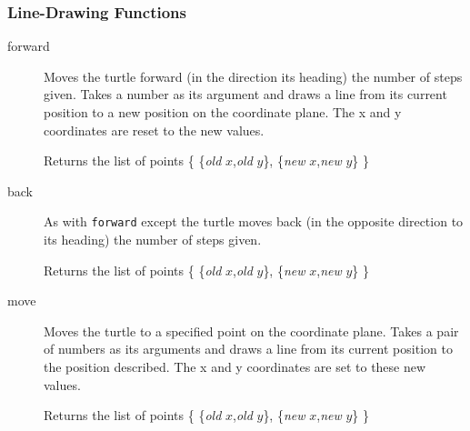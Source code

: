 \subsubsection{Line-Drawing Functions}
\begin{description}
 \item[forward] Moves the turtle forward (in the direction its heading)
       the number of steps given. Takes a number as its argument and draws
       a line from its current position to a new position on the
       coordinate plane. The x and y coordinates are reset to the new
       values.

       Returns the list of points  
    \{ \{\textit{old} $x$,\textit{old} $y$\}, \{\textit{new} $x$,\textit{new} $y$\} \}

 
 \item[back] As with \texttt{forward} except the turtle moves back (in the
       opposite direction to its heading) the number of steps given.

       Returns the list of points
    \{ \{\textit{old} $x$,\textit{old} $y$\}, \{\textit{new} $x$,\textit{new} $y$\} \}


 \item[move] Moves the turtle to a specified point on the coordinate
       plane. Takes a pair of numbers as its arguments and draws a line
       from its current position to the position described. The x and y
       coordinates are set to these new values.

       Returns the list of points 
    \{ \{\textit{old} $x$,\textit{old} $y$\}, \{\textit{new} $x$,\textit{new} $y$\} \}


\end{description}

